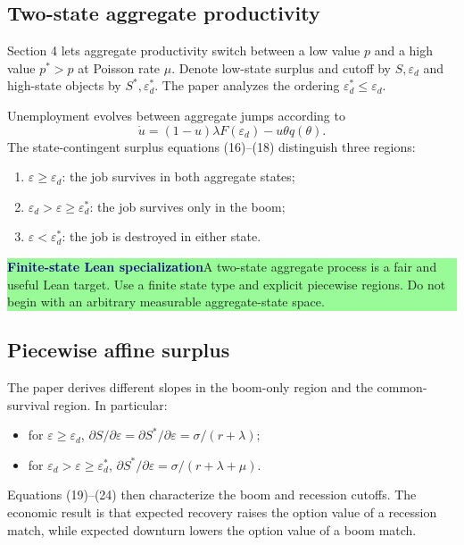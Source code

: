 \documentclass[11pt]{article}
\newcommand{\epsd}{\varepsilon_d}
\newcommand{\finite}{\textcolor{navy}{\textbf{Finite-state Lean specialization}}}
\newcommand{\statusbox}[2]{\vspace{2pt}\noindent\colorbox{#1}{\parbox{0.955\linewidth}{\small #2}}\vspace{2pt}}
\begin{document}
\subsection{Two-state aggregate productivity}

Section 4 lets aggregate productivity switch between a low value $p$ and a high value $p^*>p$ at Poisson rate $\mu$. Denote low-state surplus and cutoff by $S,\epsd$ and high-state objects by $S^*,\epsd^*$. The paper analyzes the ordering $\epsd^*\le\epsd$.

Unemployment evolves between aggregate jumps according to
\begin{equation}
 \dot u=(1-u)\lambda F(\epsd)-u\theta q(\theta). \tag{15}
\end{equation}
The state-contingent surplus equations (16)--(18) distinguish three regions:
\begin{enumerate}
\item $\varepsilon\ge\epsd$: the job survives in both aggregate states;
\item $\epsd>\varepsilon\ge\epsd^*$: the job survives only in the boom;
\item $\varepsilon<\epsd^*$: the job is destroyed in either state.
\end{enumerate}

\statusbox{paleGreen}{\finite\quad A two-state aggregate process is a fair and useful Lean target. Use a finite state type and explicit piecewise regions. Do not begin with an arbitrary measurable aggregate-state space.}

\subsection{Piecewise affine surplus}

The paper derives different slopes in the boom-only region and the common-survival region. In particular:
\begin{itemize}
\item for $\varepsilon\ge\epsd$, $\partial S/\partial\varepsilon=\partial S^*/\partial\varepsilon=\sigma/(r+\lambda)$;
\item for $\epsd>\varepsilon\ge\epsd^*$, $\partial S^*/\partial\varepsilon=\sigma/(r+\lambda+\mu)$.
\end{itemize}
Equations (19)--(24) then characterize the boom and recession cutoffs. The economic result is that expected recovery raises the option value of a recession match, while expected downturn lowers the option value of a boom match.
\end{document}
